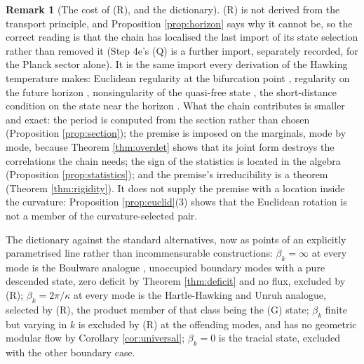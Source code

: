 \documentclass[11pt]{article}
\theoremstyle{definition}
\newtheorem{remark}[theorem]{Remark}
\begin{document}
\begin{remark}[The cost of (R), and the dictionary]\label{rem:priceR}
(R) is not derived from the transport principle, and Proposition \ref{prop:horizon} says why it cannot be, so the correct reading is that the chain has localised the last import of its state selection rather than removed it (Step 4e's (Q) is a further import, separately recorded, for the Planck sector alone). It is the same import every derivation of the Hawking temperature makes: Euclidean regularity at the bifurcation point \cite{GibbonsHawking1977, HartleHawking1976}, regularity on the future horizon \cite{Unruh1976}, nonsingularity of the quasi-free state \cite{KayWald1991}, the short-distance condition on the state near the horizon \cite{FredenhagenHaag1990}. What the chain contributes is smaller and exact: the period is computed from the section rather than chosen (Proposition \ref{prop:section}); the premise is imposed on the marginals, mode by mode, because Theorem \ref{thm:overdet} shows that its joint form destroys the correlations the chain needs; the sign of the statistics is located in the algebra (Proposition \ref{prop:statistics}); and the premise's irreducibility is a theorem (Theorem \ref{thm:rigidity}). It does not supply the premise with a location inside the curvature: Proposition \ref{prop:euclid}(3) shows that the Euclidean rotation is not a member of the curvature-selected pair.

The dictionary against the standard alternatives, now as points of an explicitly parametrised line rather than incommensurable constructions: $\beta_k = \infty$ at every mode is the Boulware analogue \cite{Boulware1975}, unoccupied boundary modes with a pure descended state, zero deficit by Theorem \ref{thm:deficit} and no flux, excluded by (R); $\beta_k = 2\pi/\kappa$ at every mode is the Hartle-Hawking and Unruh analogue, selected by (R), the product member of that class being the (G) state; $\beta_k$ finite but varying in $k$ is excluded by (R) at the offending modes, and has no geometric modular flow by Corollary \ref{cor:universal}; $\beta_k = 0$ is the tracial state, excluded with the other boundary case.


\end{remark}
\end{document}
